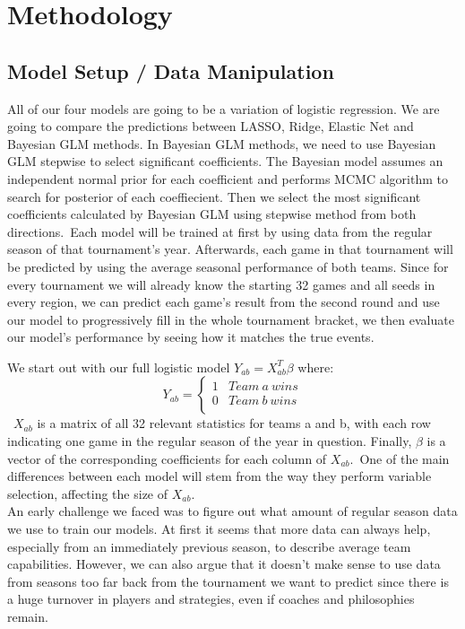\documentclass{article} %
\begin{document}
\section{Methodology}
\label{gen_inst}

\subsection{Model Setup / Data Manipulation}
All of our four models are going to be a variation of logistic regression. We are going to compare the predictions between LASSO, Ridge, Elastic Net and Bayesian GLM methods. In Bayesian GLM methods, we need to use Bayesian GLM stepwise to select significant coefficients. The Bayesian model assumes an independent normal prior for each coefficient and performs MCMC algorithm to search for posterior of each coeffiecient. Then we select the most significant coefficients calculated by Bayesian GLM using stepwise method from both directions.\
Each model will be trained at first by using data from the regular season of that tournament's year. Afterwards, each game in that tournament will be predicted by using the average seasonal performance of both teams. Since for every tournament we will already know the starting 32 games and all seeds in every region, we can predict each game's result from the second round and use our model to progressively fill in the whole tournament bracket, we then evaluate our model's performance by seeing how it matches the true events.

We start out with our full logistic model $Y_{ab} = X_{ab}^T \beta$ where:\
\[ Y_{ab} = \left\{
\begin{array}{ll}
1 & Team \ a \ wins \\
0 &  Team \ b \ wins \\
\end{array} 
\right. \]\
$X_{ab}$ is a matrix of all 32 relevant statistics for teams a and b, with each row indicating one game in the regular season of the year in question. Finally, $\beta$ is a vector of the corresponding coefficients for each column of $X_{ab}$.\ One of the main differences between each model will stem from the way they perform variable selection, affecting the size of $X_{ab}$.\\

An early challenge we faced was to figure out what amount of regular season data we use to train our models. At first it seems that more data can always help, especially from an immediately previous season, to describe average team capabilities.  However, we can also argue that it doesn't make sense to use data from seasons too far back from the tournament we want to predict since there is a huge turnover in players and strategies, even if coaches and philosophies remain.
\end{document}
